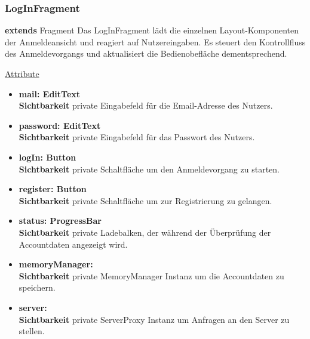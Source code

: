 \subsubsection{LogInFragment} \label{app:klasse:LogInFragment}
\textbf{extends} Fragment \newline
Das LogInFragment lädt die einzelnen Layout-Komponenten der Anmeldeansicht und reagiert auf Nutzereingaben. Es steuert den Kontrollfluss des Anmeldevorgangs und aktualisiert die Bedienobefläche dementsprechend.
\newline

\underline{Attribute}
\begin{itemize}
\itemsep0pt
\item \textbf{mail: EditText} \hfill\\ 
\textbf{Sichtbarkeit} private \newline
Eingabefeld für die Email-Adresse des Nutzers.

\item \textbf{password: EditText} \hfill\\ 
\textbf{Sichtbarkeit} private \newline
Eingabefeld für das Passwort des Nutzers.

\item \textbf{logIn: Button} \hfill\\ 
\textbf{Sichtbarkeit} private \newline
Schaltfläche um den Anmeldevorgang zu starten.

\item \textbf{register: Button} \hfill\\ 
\textbf{Sichtbarkeit} private \newline
Schaltfläche um zur Registrierung zu gelangen.

\item \textbf{status: ProgressBar} \hfill\\ 
\textbf{Sichtbarkeit} private \newline
Ladebalken, der während der Überprüfung der Accountdaten angezeigt wird.

\item \textbf{memoryManager: } \hfill\\ 
\textbf{Sichtbarkeit} private \newline
MemoryManager Instanz um die Accountdaten zu speichern.

\item \textbf{server: } \hfill\\ 
\textbf{Sichtbarkeit} private \newline
ServerProxy Instanz um Anfragen an den Server zu stellen.


\end{itemize}
